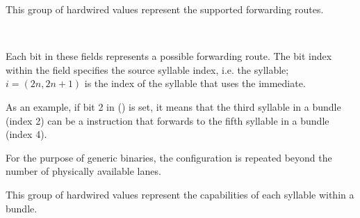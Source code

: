 

This group of hardwired values represent the supported  forwarding
routes.

\reset{****************}
\  %

\implementation{}

\reset{****************}

Each bit in these fields represents a possible  forwarding route. 
The bit index within the field specifies the source syllable index, i.e. the 
 syllable; $i = \left ( 2n, 2n+1 \right )$ is the index of the 
syllable that uses the immediate.

As an example, if bit 2 in  () is set, it means that 
the third syllable in a bundle (index 2) can be a  instruction that 
forwards to the fifth syllable in a bundle (index 4).

For the purpose of generic binaries, the configuration is repeated beyond the
number of physically available lanes.

\implementation{}


This group of hardwired values represent the capabilities of each syllable
within a bundle.

